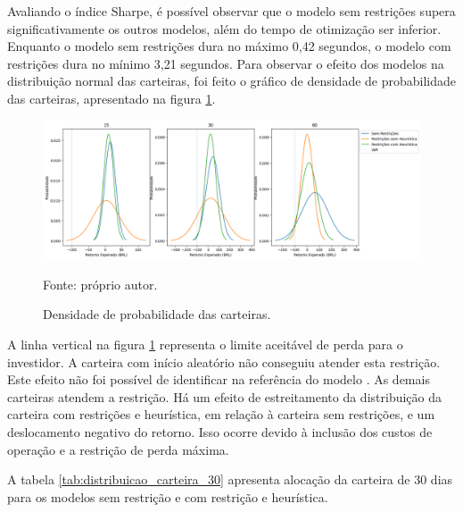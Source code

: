         \ipar Avaliando o índice Sharpe, é possível observar que o modelo sem restrições supera significativamente os outros modelos, além do tempo de otimização ser inferior. Enquanto o modelo sem restrições dura no máximo 0,42 segundos, o modelo com restrições dura no mínimo 3,21 segundos. Para observar o efeito dos modelos na distribuição normal das carteiras, foi feito o gráfico de densidade de probabilidade das carteiras, apresentado na figura \ref{fig:densidade_carteiras}.

        \begin{figure}[H]
            \centering
            \caption{Densidade de probabilidade das carteiras.}
            \label{fig:densidade_carteiras}
            \includegraphics[width=\textwidth]{./imagens/distribuicao_carteiras.png}
            \par \footnotesize Fonte: próprio autor.
        \end{figure}

        \ipar A linha vertical na figura \ref{fig:densidade_carteiras} representa o limite aceitável de perda para o investidor. A carteira com início aleatório não conseguiu atender esta restrição. Este efeito não foi possível de identificar na referência do modelo \cite{hedengren2014nonlinear}. As demais carteiras atendem a restrição. Há um efeito de estreitamento da distribuição da carteira com restrições e heurística, em relação à carteira sem restrições, e um deslocamento negativo do retorno. Isso ocorre devido à inclusão dos custos de operação e a restrição de perda máxima.

        \ipar A tabela \ref{tab:distribuicao_carteira_30} apresenta alocação da carteira de 30 dias para os modelos sem restrição e com restrição e heurística. 

